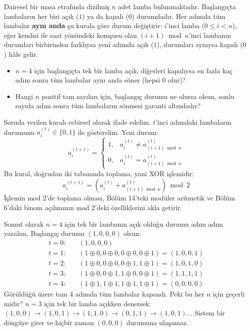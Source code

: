 \begin{example}
Dairesel bir masa etrafında dizilmiş $n$ adet lamba bulunmaktadır. Başlangıçta lambaların her biri açık ($1$) ya da kapalı ($0$) durumdadır. Her adımda tüm lambalar \textbf{aynı anda} şu kurala göre durum değiştirir: $i$'inci lamba ($0 \le i < n$), eğer kendisi ile saat yönündeki komşusu olan $(i+1) \bmod n$'inci lambanın durumları birbirinden farklıysa yeni adımda açık ($1$), durumları aynıysa kapalı ($0$) hâle gelir.
\begin{itemize}
    \item[(a)] $n=4$ için başlangıçta tek bir lamba açık, diğerleri kapalıysa en fazla kaç adım sonra tüm lambalar aynı anda söner (hepsi $0$ olur)?
    \item[(b)] Hangi $n$ pozitif tam sayıları için, başlangıç durumu ne olursa olsun, sonlu sayıda adım sonra tüm lambaların sönmesi garanti altındadır?
\end{itemize}
\end{example}

Soruda verilen kuralı cebirsel olarak ifade edelim. $t$'inci adımdaki lambaların durumunu $a_i^{(t)} \in \{0, 1\}$ ile gösterelim. Yeni durum:
\[
a_i^{(t+1)} = 
\begin{cases}
1, & a_i^{(t)} \neq a_{(i+1) \bmod n}^{(t)} \\
0, & a_i^{(t)} = a_{(i+1) \bmod n}^{(t)}
\end{cases}
\]
Bu kural, doğrudan iki tabanında toplama, yani XOR işlemidir:
\[
a_i^{(t+1)} = (a_i^{(t)} + a_{(i+1) \bmod n}^{(t)}) \bmod 2
\]
İşlemin mod $2$'de toplama olması, Bölüm 14'teki modüler aritmetik ve Bölüm 6'daki binom açılımının mod $2$'deki özelliklerini akla getirir.

Somut olarak $n=4$ için tek bir lambanın açık olduğu durumu adım adım yazalım. Başlangıç durumu $(1, 0, 0, 0)$ olsun:
\begin{align*}
t = 0: & \quad (1, 0, 0, 0) \\
t = 1: & \quad (1\oplus 0, 0\oplus 0, 0\oplus 0, 0\oplus 1) = (1, 0, 0, 1) \\
t = 2: & \quad (1\oplus 0, 0\oplus 0, 0\oplus 1, 1\oplus 1) = (1, 0, 1, 0) \\
t = 3: & \quad (1\oplus 0, 0\oplus 1, 1\oplus 0, 0\oplus 1) = (1, 1, 1, 1) \\
t = 4: & \quad (1\oplus 1, 1\oplus 1, 1\oplus 1, 1\oplus 1) = (0, 0, 0, 0)
\end{align*}
Görüldüğü üzere tam 4 adımda tüm lambalar kapandı. Peki bu her $n$ için geçerli midir? $n=3$ için tek bir lamba açıkken denersek: $(1, 0, 0) \to (1, 0, 1) \to (1, 1, 0) \to (0, 1, 1) \to (1, 0, 1) \dots$ Sistem bir döngüye girer ve hiçbir zaman $(0, 0, 0)$ durumuna ulaşamaz.

